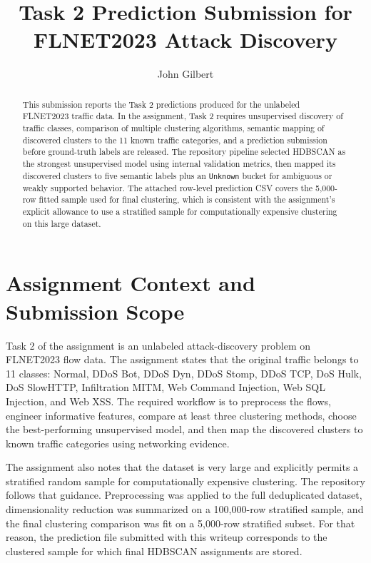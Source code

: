 \documentclass[journal,onecolumn]{IEEEtran}
\title{Task 2 Prediction Submission for FLNET2023 Attack Discovery}
\author{John Gilbert}
\begin{document}
\maketitle

\begin{abstract}
This submission reports the Task 2 predictions produced for the unlabeled FLNET2023 traffic data. In the assignment, Task 2 requires unsupervised discovery of traffic classes, comparison of multiple clustering algorithms, semantic mapping of discovered clusters to the 11 known traffic categories, and a prediction submission before ground-truth labels are released. The repository pipeline selected HDBSCAN as the strongest unsupervised model using internal validation metrics, then mapped its discovered clusters to five semantic labels plus an \texttt{Unknown} bucket for ambiguous or weakly supported behavior. The attached row-level prediction CSV covers the 5,000-row fitted sample used for final clustering, which is consistent with the assignment's explicit allowance to use a stratified sample for computationally expensive clustering on this large dataset.
\end{abstract}

\section{Assignment Context and Submission Scope}
Task 2 of the assignment is an unlabeled attack-discovery problem on FLNET2023 flow data. The assignment states that the original traffic belongs to 11 classes: Normal, DDoS Bot, DDoS Dyn, DDoS Stomp, DDoS TCP, DoS Hulk, DoS SlowHTTP, Infiltration MITM, Web Command Injection, Web SQL Injection, and Web XSS. The required workflow is to preprocess the flows, engineer informative features, compare at least three clustering methods, choose the best-performing unsupervised model, and then map the discovered clusters to known traffic categories using networking evidence.

The assignment also notes that the dataset is very large and explicitly permits a stratified random sample for computationally expensive clustering. The repository follows that guidance. Preprocessing was applied to the full deduplicated dataset, dimensionality reduction was summarized on a 100,000-row stratified sample, and the final clustering comparison was fit on a 5,000-row stratified subset. For that reason, the prediction file submitted with this writeup corresponds to the clustered sample for which final HDBSCAN assignments are stored.
\end{document}
